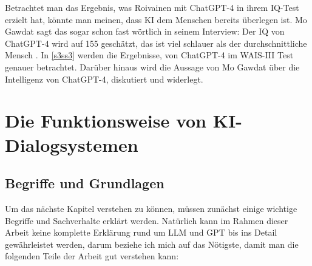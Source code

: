 	Betrachtet man das Ergebnis, was Roivainen mit ChatGPT-4 in ihrem IQ-Test erzielt hat, könnte man meinen,
	dass KI dem Menschen bereits überlegen ist. Mo Gawdat sagt das sogar schon fast wörtlich in seinem Interview:
	\glqq{}Der IQ von ChatGPT-4 wird auf 155 geschätzt, das ist viel schlauer als der durchschnittliche Mensch\grqq{} 
	\cite{gawdat23}. In \ref{s3ss3} werden die Ergebnisse, von ChatGPT-4 im WAIS-III Test genauer betrachtet.
	Darüber hinaus wird die Aussage von Mo Gawdat über die Intelligenz von ChatGPT-4, diskutiert und widerlegt. 	

\clearpage	
\section{Die Funktionsweise von KI-Dialogsystemen}
	\subsection{Begriffe und Grundlagen}\label{s2ss1}
	Um das nächste Kapitel verstehen zu können, müssen zunächst einige wichtige Begriffe und Sachverhalte erklärt 
	werden. Natürlich kann im Rahmen dieser Arbeit keine komplette Erklärung rund um LLM und GPT bis ins Detail
	gewährleistet werden, darum beziehe ich mich auf das Nötigste, damit man die folgenden Teile der Arbeit gut verstehen
	kann: 
	
